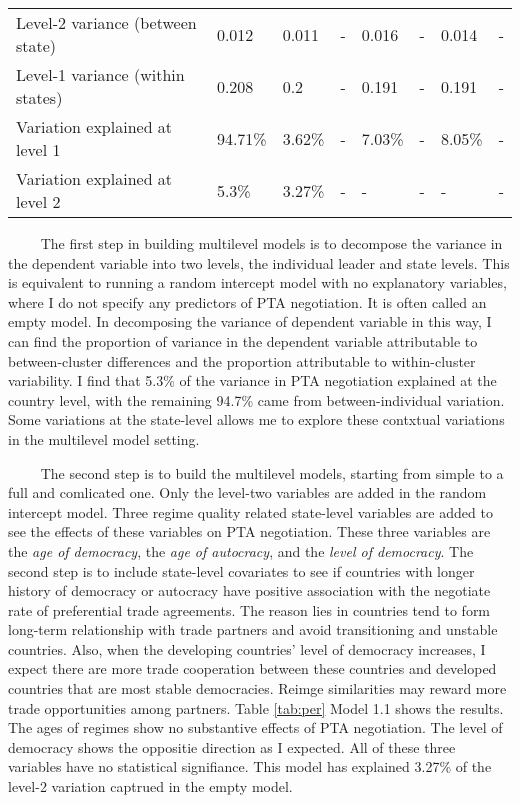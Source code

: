 \documentclass[12pt,]{article}
\begin{document}
\begin{landscape}
\begin{table}[!h]
\begin{tabular}[t]{llllllll}
\hspace{1em}Level-2 variance (between state) & 0.012 & 0.011 & - & 0.016 & - & 0.014 & -\\
\hspace{1em}Level-1 variance (within states) & 0.208 & 0.2 & - & 0.191 & - & 0.191 & -\\
\hspace{1em}Variation explained at level 1 & 94.71\% & 3.62\% & - & 7.03\% & - & 8.05\% & -\\
\hspace{1em}Variation explained at level 2 & 5.3\% & 3.27\% & - & - & - & - & -\\
\bottomrule
\end{tabular}
\end{table}
\end{landscape}

\(\qquad\) The first step in building multilevel models is to decompose
the variance in the dependent variable into two levels, the individual
leader and state levels. This is equivalent to running a random
intercept model with no explanatory variables, where I do not specify
any predictors of PTA negotiation. It is often called an empty model. In
decomposing the variance of dependent variable in this way, I can find
the proportion of variance in the dependent variable attributable to
between-cluster differences and the proportion attributable to
within-cluster variability. I find that 5.3\% of the variance in PTA
negotiation explained at the country level, with the remaining 94.7\%
came from between-individual variation. Some variations at the
state-level allows me to explore these contxtual variations in the
multilevel model setting.

\(\qquad\) The second step is to build the multilevel models, starting
from simple to a full and comlicated one. Only the level-two variables
are added in the random intercept model. Three regime quality related
state-level variables are added to see the effects of these variables on
PTA negotiation. These three variables are the \emph{age of democracy},
the \emph{age of autocracy}, and the \emph{level of democracy}. The
second step is to include state-level covariates to see if countries
with longer history of democracy or autocracy have positive association
with the negotiate rate of preferential trade agreements. The reason
lies in countries tend to form long-term relationship with trade
partners and avoid transitioning and unstable countries. Also, when the
developing countries' level of democracy increases, I expect there are
more trade cooperation between these countries and developed countries
that are most stable democracies. Reimge similarities may reward more
trade opportunities among partners. Table \ref{tab:per} Model 1.1 shows
the results. The ages of regimes show no substantive effects of PTA
negotiation. The level of democracy shows the oppositie direction as I
expected. All of these three variables have no statistical signifiance.
This model has explained 3.27\% of the level-2 variation captrued in the
empty model.
\end{document}
